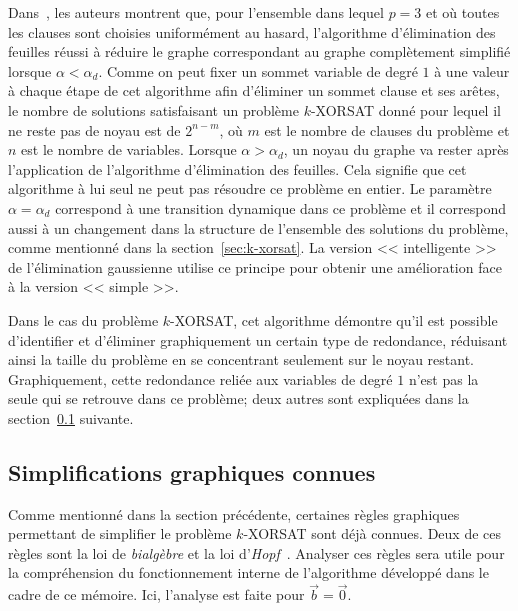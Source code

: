 Dans~\cite{mezard_alternative_2002}, les auteurs montrent que, pour l'ensemble dans lequel $p = 3$ et où toutes les clauses sont choisies uniformément au hasard, l'algorithme d'élimination des feuilles réussi à réduire le graphe correspondant au graphe complètement simplifié lorsque $ \alpha < \alpha_d$.
Comme on peut fixer un sommet variable de degré $1$ à une valeur à chaque étape de cet algorithme afin d'éliminer un sommet clause et ses arêtes, le nombre de solutions satisfaisant un problème $k$-XORSAT donné pour lequel il ne reste pas de noyau est de $2^{n-m}$, où $m$ est le nombre de clauses du problème et $n$ est le nombre de variables.
Lorsque $\alpha > \alpha_d$, un noyau du graphe va rester après l'application de l'algorithme d'élimination des feuilles.
Cela signifie que cet algorithme à lui seul ne peut pas résoudre ce problème en entier.
Le paramètre $\alpha = \alpha_d$ correspond à une transition dynamique dans ce problème et il correspond aussi à un changement dans la structure de l'ensemble des solutions du problème, comme mentionné dans la section~\ref{sec:k-xorsat}.
La version << intelligente >> de l'élimination gaussienne utilise ce principe pour obtenir une amélioration face à la version << simple >>.


Dans le cas du problème $k$-XORSAT, cet algorithme démontre qu'il est possible d'identifier et d'éliminer graphiquement un certain type de redondance, réduisant ainsi la taille du problème en se concentrant seulement sur le noyau restant.
Graphiquement, cette redondance reliée aux variables de degré $1$ n'est pas la seule qui se retrouve dans ce problème; deux autres sont expliquées dans la section~\ref{subsec:XORSAT-simplifications} suivante.

\subsection{Simplifications graphiques connues} \label{subsec:XORSAT-simplifications}
Comme mentionné dans la section précédente, certaines règles graphiques permettant de simplifier le problème $k$-XORSAT sont déjà connues.
Deux de ces règles sont la loi de \emph{bialgèbre} et la loi d'\emph{Hopf}~\cite{kasselQuantumGroups1995, denny_algebraically_2012}.
Analyser ces règles sera utile pour la compréhension du fonctionnement interne de l'algorithme développé dans le cadre de ce mémoire.
Ici, l'analyse est faite pour $\vec{b} = \vec{0}$.

